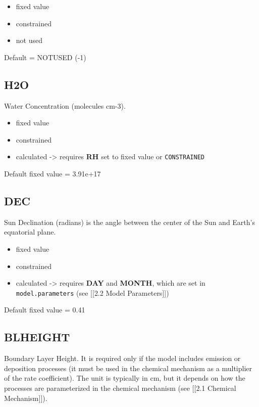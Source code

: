 \begin{itemize}
\tightlist
\item
  fixed value
\item
  constrained
\item
  not used
\end{itemize}

Default = NOTUSED (-1)

\hypertarget{h2o}{%
\subsection{H2O}\label{h2o}}

Water Concentration (molecules cm-3).

\begin{itemize}
\tightlist
\item
  fixed value
\item
  constrained
\item
  calculated -\textgreater{} requires \textbf{RH} set to fixed value or
  \texttt{CONSTRAINED}
\end{itemize}

Default fixed value = 3.91e+17

\hypertarget{dec}{%
\subsection{DEC}\label{dec}}

Sun Declination (radians) is the angle between the center of the Sun and
Earth's equatorial plane.

\begin{itemize}
\tightlist
\item
  fixed value
\item
  constrained
\item
  calculated -\textgreater{} requires \textbf{DAY} and \textbf{MONTH},
  which are set in \texttt{model.parameters} (see {[}{[}2.2 Model
  Parameters{]}{]})
\end{itemize}

Default fixed value = 0.41

\hypertarget{blheight}{%
\subsection{BLHEIGHT}\label{blheight}}

Boundary Layer Height. It is required only if the model includes
emission or deposition processes (it must be used in the chemical
mechanism as a multiplier of the rate coefficient). The unit is
typically in cm, but it depends on how the processes are parameterized
in the chemical mechanism (see {[}{[}2.1 Chemical Mechanism{]}{]}).

